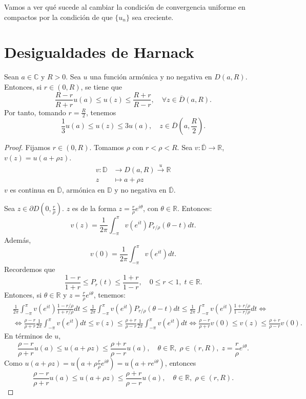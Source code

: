 Vamos a ver qué sucede al cambiar la condición de convergencia uniforme en compactos por la condición de que $\{u_n\}$ sea creciente.

\section{Desigualdades de Harnack}
Sean $a \in \mathbb{C}$ y $R > 0$.
Sea $u$ una función armónica y no negativa en $D(a, R)$.
Entonces, si $r \in (0, R)$, se tiene que
$$\frac{R-r}{R+r}u(a) \leq u(z) \leq \frac{R+r}{R-r}, \quad \forall z \in \overline{D}(a, R).$$
Por tanto, tomando $r = \frac{R}{2}$, tenemos
$$\frac{1}{3}u(a) \leq u(z) \leq 3u(a), \quad z \in \overline{D}\left(a, \frac{R}{2}\right).$$

\begin{proof}
    Fijamos $r \in (0, R)$.
    Tomamos $\rho$ con $r < \rho < R$.
    Sea $v: \overline{\mathbb{D}} \to \mathbb{R}$, $v(z) = u(a + \rho z)$.
    \begin{align*}
        v: \mathbb{D} & \to D(a, R) \xrightarrow{u} \mathbb{R} \\
        z             & \mapsto a + \rho z
    \end{align*}
    $v$ es continua en $\overline{\mathbb{D}}$, armónica en $\mathbb{D}$ y no negativa en $\overline{\mathbb{D}}$.

    Sea $z \in \partial D\left(0, \frac{r}{\rho}\right)$.
    $z$ es de la forma $z = \frac{r}{\rho}e^{i\theta}$, con $\theta \in \mathbb{R}$.
    Entonces:
    $$v(z) = \frac{1}{2\pi} \int_{-\pi}^\pi v(e^{it})P_{r/\rho}(\theta-t)dt.$$
    Además,
    $$v(0) = \frac{1}{2\pi} \int_{-\pi}^\pi v(e^{it})dt.$$
    Recordemos que
    $$\frac{1-r}{1+r} \leq P_r(t) \leq \frac{1+r}{1-r}, \quad 0 \leq r < 1, \; t \in \mathbb{R}.$$
    Entonces, si $\theta \in \mathbb{R}$ y $z = \frac{r}{\rho}e^{i\theta}$, tenemos:
    \begin{align*}
         & \frac{1}{2\pi} \int_{-\pi}^\pi v(e^{it})\frac{1-r/\rho}{1+r/\rho}dt \leq \frac{1}{2\pi} \int_{-\pi}^\pi v(e^{it})P_{r/\rho}(\theta-t)dt \leq \frac{1}{2\pi} \int_{-\pi}^\pi v(e^{it})\frac{1+r/\rho}{1-r/\rho}dt \Leftrightarrow                     \\
         & \Leftrightarrow \frac{\rho-r}{\rho+r} \frac{1}{2\pi} \int_{-\pi}^\pi v(e^{it})dt \leq v(z) \leq \frac{\rho+r}{\rho-r} \frac{1}{2\pi} \int_{-\pi}^\pi v(e^{it})dt \Leftrightarrow \frac{\rho-r}{\rho+r}v(0) \leq v(z) \leq \frac{\rho+r}{\rho-r}v(0).
    \end{align*}
    En términos de $u$,
    $$\frac{\rho-r}{\rho+r}u(a) \leq u(a+\rho z) \leq \frac{\rho+r}{\rho-r}u(a), \quad \theta \in \mathbb{R}, \; \rho \in (r, R), \; z = \frac{r}{\rho}e^{i\theta}.$$
    Como $u(a+\rho z) = u\left(a + \rho\frac{r}{\rho}e^{i\theta}\right) = u(a + re^{i\theta})$, entonces
    $$\frac{\rho-r}{\rho+r}u(a) \leq u(a+\rho z) \leq \frac{\rho+r}{\rho-r}u(a), \quad \theta \in \mathbb{R}, \; \rho \in (r, R).$$


\end{proof}
